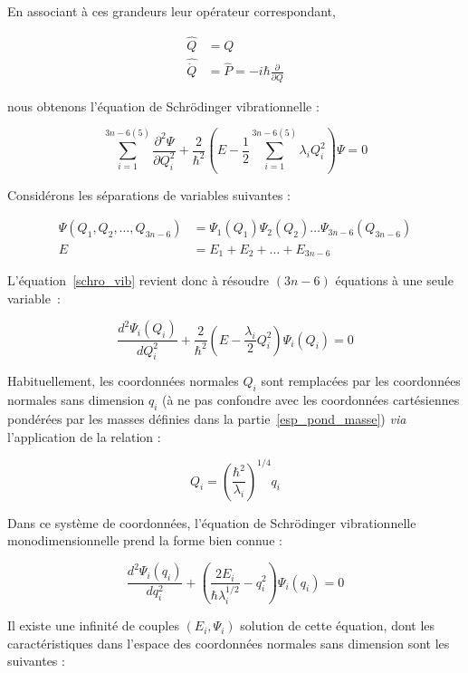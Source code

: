 En associant à ces grandeurs leur opérateur correspondant,

\begin{align}
\hat{Q} &= Q \\
\hat{\dot{Q}} &= \hat{P} = -i\hbar \frac{\partial}{\partial Q}
\end{align}

\noindent nous obtenons l'équation de Schr\"{o}dinger vibrationnelle :

\begin{equation}
\sum^{3n-6(5)}_{i=1} \frac{\partial^2 \Psi}{\partial Q^2_i} + \frac{2}{\hbar^2}\left(E - \frac{1}{2} \sum^{3n-6(5)}_{i=1} \lambda_i Q^2_i\right) \Psi = 0
\label{schro_vib}
\end{equation}


Considérons les séparations de variables suivantes :

\begin{align}
\Psi(Q_1,Q_2,\ldots,Q_{3n-6}) &= \Psi_1(Q_1) \Psi_2(Q_2)\ldots \Psi_{3n-6}(Q_{3n-6}) \\
E &= E_1 +E_2 + \ldots + E_{3n-6}
\end{align}

L'équation~\ref{schro_vib} revient donc à résoudre $(3n-6)$ équations à une seule variable~:

\begin{equation}
\frac{d^2 \Psi_i(Q_i)}{dQ^2_i} + \frac{2}{\hbar^2}\left(E - \frac{\lambda_i}{2} Q^2_i\right) \Psi_i\left(Q_i\right) = 0	
\end{equation}

Habituellement, les coordonnées normales $Q_i$ sont remplacées par les coordonnées normales sans dimension $q_i$ (à ne pas confondre avec les coordonnées cartésiennes pondérées par les masses définies dans la partie~\ref{esp_pond_masse}) \textit{via} l'application de la relation :

\begin{equation}
Q_i = \left(\frac{\hbar^2}{\lambda_i}\right)^{1/4} q_i
\end{equation}

Dans ce système de coordonnées, l'équation de Schr\"{o}dinger vibrationnelle monodimensionnelle prend la forme bien connue :

\begin{equation}
\frac{d^2 \Psi_i(q_i)}{dq^2_i} + \left(\frac{2E_i}{\hbar\lambda^{1/2}_i} - q^2_i\right) \Psi_i\left(q_i\right) = 0	
\end{equation}

Il existe une infinité de couples $(E_i, \Psi_i)$ solution de cette équation, dont les caractéristiques dans l'espace des coordonnées normales sans dimension sont les suivantes :


